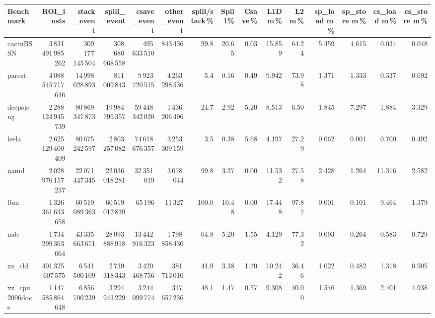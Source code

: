 \documentclass[9pt,landscape,a4paper]{article}
\begin{document}
\vspace{2mm}
\centering
\begin{adjustbox}{max width=\textwidth, max totalheight=0.50\textheight}%
\begin{tabular}{lrrrrrrrrrrrrrr}
\toprule
Benchmark & ROI\_insts & stack\_event & \textbf{spill\_event} & csave\_event & other\_event & spill/stack\,\% & Spill\,\% & Csave\,\% & L1D m\,\% & L2 m\,\% & sp\_load m\,\% & sp\_store m\,\% & cs\_load m\,\% & cs\_store m\,\% \\
\midrule
cactuBSSN & 3\,831\,491\,985\,262 & 309\,177\,145\,504 & 308\,680\,668\,558 & 495\,633\,510 & 843\,436 & 99.8 & 20.65 & 0.03 & 15.859 & 64.24 & 5.459 & 4.615 & 0.034 & 0.048 \\
parest & 4\,088\,545\,717\,646 & 14\,998\,028\,893 & 811\,009\,843 & 9\,923\,720\,515 & 4\,263\,298\,536 & 5.4 & 0.16 & 0.49 & 9.942 & 73.98 & 1.371 & 1.333 & 0.337 & 0.692 \\
deepsjeng & 2\,288\,124\,945\,739 & 80\,869\,347\,873 & 19\,984\,799\,357 & 59\,448\,342\,020 & 1\,436\,206\,496 & 24.7 & 2.92 & 5.20 & 8.513 & 6.50 & 1.845 & 7.297 & 1.884 & 3.329 \\
leela & 2\,625\,129\,460\,409 & 80\,675\,242\,597 & 2\,803\,257\,082 & 74\,618\,676\,357 & 3\,253\,309\,159 & 3.5 & 0.38 & 5.68 & 4.197 & 27.29 & 0.062 & 0.001 & 0.700 & 0.492 \\
namd & 2\,028\,976\,157\,237 & 22\,071\,447\,345 & 22\,036\,018\,281 & 32\,351\,019 & 3\,078\,044 & 99.8 & 3.27 & 0.00 & 11.532 & 27.58 & 2.428 & 1.264 & 11.316 & 2.582 \\
lbm & 1\,326\,361\,633\,658 & 60\,519\,089\,363 & 60\,519\,012\,839 & 65\,196 & 11\,327 & 100.0 & 10.48 & 0.00 & 17.448 & 97.87 & 0.001 & 0.101 & 9.464 & 1.379 \\
nab & 1\,734\,299\,363\,064 & 43\,335\,663\,671 & 28\,093\,888\,918 & 13\,442\,916\,323 & 1\,798\,858\,430 & 64.8 & 5.20 & 1.55 & 4.129 & 77.32 & 0.093 & 0.264 & 0.583 & 0.729 \\
xz\_cld & 401\,325\,607\,575 & 6\,541\,500\,109 & 2\,739\,318\,343 & 3\,420\,468\,756 & 381\,713\,010 & 41.9 & 3.38 & 1.70 & 10.242 & 36.46 & 1.022 & 0.482 & 1.318 & 0.905 \\
xz\_cpu2006docs & 1\,147\,585\,864\,648 & 6\,856\,700\,239 & 3\,294\,943\,229 & 3\,244\,099\,774 & 317\,657\,236 & 48.1 & 1.47 & 0.57 & 9.308 & 40.00 & 1.546 & 1.369 & 2.401 & 4.938 \\

\end{tabular}
\end{adjustbox}
\end{document}

